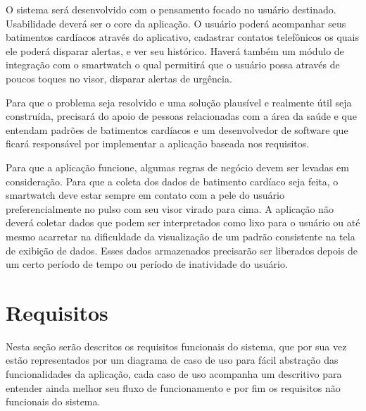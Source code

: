 \documentclass[
	12pt,				%
	openright,			%
	oneside,			%
	a4paper,			%
	english,			%
	french,				%
	spanish,			%
	brazil				%
]{abntex2}
\begin{document}
O sistema será desenvolvido com o pensamento focado no usuário destinado. Usabilidade deverá ser o core da aplicação. O usuário poderá acompanhar seus batimentos cardíacos através do aplicativo, cadastrar contatos telefônicos os quais ele poderá disparar alertas, e ver seu histórico. Haverá também um módulo de integração com o smartwatch o qual permitirá que o usuário possa através de poucos toques no visor, disparar alertas de urgência.

Para que o problema seja resolvido e uma solução plausível e realmente útil seja construída, precisará do apoio de pessoas relacionadas com a área da saúde e que entendam padrões de batimentos cardíacos e um desenvolvedor de software que ficará responsável por implementar a aplicação baseada nos requisitos.

Para que a aplicação funcione, algumas regras de negócio devem ser levadas em consideração. Para que a coleta dos dados de batimento cardíaco seja feita, o smartwatch deve estar sempre em contato com a pele do usuário preferencialmente no pulso com seu visor virado para cima. A aplicação não deverá coletar dados que podem ser interpretados como lixo para o usuário ou até mesmo acarretar na dificuldade da visualização de um padrão consistente na tela de exibição de dados. Esses dados armazenados precisarão ser liberados depois de um certo período de tempo ou período de inatividade do usuário.




\chapter{Requisitos}
Nesta seção serão descritos os requisitos funcionais do sistema, que por sua vez estão representados por um diagrama de caso de uso para fácil abstração das funcionalidades da aplicação, cada caso de uso acompanha um descritivo para entender ainda melhor seu fluxo de funcionamento e por fim os requisitos não funcionais do sistema.
\end{document}
